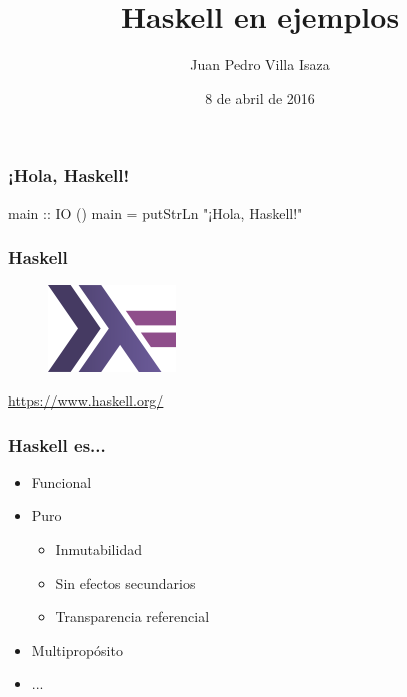 \documentclass[spanish]{beamer}
\title{Haskell en ejemplos}
\author{Juan Pedro Villa Isaza}
\institute{Stack Builders}
\date{8 de abril de 2016}
\begin{document}

\frame{\titlepage}


\begin{frame}[fragile]
  \frametitle{¡Hola, Haskell!}

  \begin{code}
main :: IO ()
main = putStrLn "¡Hola, Haskell!"
  \end{code}
\end{frame}


\begin{frame}
  \frametitle{Haskell}

  \begin{figure}
    \includegraphics[scale=0.6]{haskell-logo.png}
  \end{figure}

  \begin{center}
    \url{https://www.haskell.org/}
  \end{center}
\end{frame}


\begin{frame}
  \frametitle{Haskell es...}

  \begin{itemize}
  \item Funcional
  \item
    Puro
    \begin{itemize}
    \item
      Inmutabilidad
    \item
      Sin efectos secundarios
    \item
      Transparencia referencial
    \end{itemize}
  \item
    Multipropósito
  \item
    ...
  \end{itemize}
\end{frame}
\end{document}
